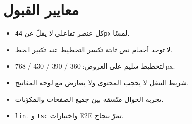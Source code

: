 \documentclass[11pt]{article}
\begin{document}
\section{معايير القبول}

\begin{itemize}
  \item[${\color{okgreen}\faCheckCircle}$] كل عنصر تفاعلي لا يقلّ عن \texttt{44px} لمسًا.
  \item[${\color{okgreen}\faCheckCircle}$] لا توجد أحجام نص ثابتة تكسر التخطيط عند تكبير الخط.
  \item[${\color{okgreen}\faCheckCircle}$] التخطيط سليم على العروض: 360 / 390 / 430 / 768px.
  \item[${\color{okgreen}\faCheckCircle}$] شريط التنقل لا يحجب المحتوى ولا يتعارض مع لوحة المفاتيح.
  \item[${\color{okgreen}\faCheckCircle}$] تجربة الجوال متّسقة بين جميع الصفحات والمكوّنات.
  \item[${\color{okgreen}\faCheckCircle}$] \texttt{lint} و \texttt{tsc} واختبارات E2E تمرّ بنجاح.
\end{itemize}
\end{document}
